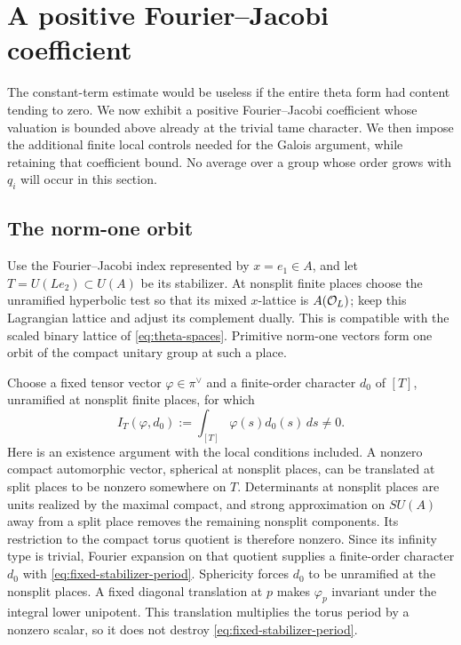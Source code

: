 \section{A positive Fourier--Jacobi coefficient}
\label{sec:content}

The constant-term estimate would be useless if the entire theta form had
content tending to zero.  We now exhibit a positive Fourier--Jacobi
coefficient whose valuation is bounded above already at the trivial
tame character.
We then impose the additional finite local controls needed for the
Galois argument, while retaining that coefficient bound.  No average
over a group whose order grows with $q_i$ will occur in this section.

\subsection{The norm-one orbit}

Use the Fourier--Jacobi index represented by $x=e_1\in A$, and let
$T=U(Le_2)\subset U(A)$ be its stabilizer.  At nonsplit finite places
choose the unramified hyperbolic test so that its mixed $x$-lattice is
$A(\mathcal O_L)$; keep this Lagrangian lattice and adjust its complement dually.
This is compatible with the scaled binary lattice of
\eqref{eq:theta-spaces}.  Primitive norm-one vectors form one orbit of
the compact unitary group at such a place.

Choose a fixed tensor vector $\varphi\in\pi^\vee$ and a finite-order
character $d_0$ of $[T]$, unramified at nonsplit finite places, for which
\begin{equation}\label{eq:fixed-stabilizer-period}
 I_T(\varphi,d_0):=\int_{[T]}\varphi(s)d_0(s)\,ds\ne0.
\end{equation}
Here is an existence argument with the local conditions included.
A nonzero compact automorphic vector, spherical at nonsplit places, can
be translated at split places to be nonzero somewhere on $T$.
Determinants at nonsplit places are units realized by the maximal compact,
and strong approximation on $SU(A)$ away from a split place removes the
remaining nonsplit components.  Its restriction to the compact torus
quotient is therefore nonzero.  Since its infinity type is trivial,
Fourier expansion on that quotient supplies a finite-order character
$d_0$ with \eqref{eq:fixed-stabilizer-period}.  Sphericity forces $d_0$
to be unramified at the nonsplit places.  A fixed diagonal translation
at $p$ makes $\varphi_p$ invariant under the integral lower unipotent.
This translation multiplies the torus period by a nonzero scalar, so it
does not destroy \eqref{eq:fixed-stabilizer-period}.

